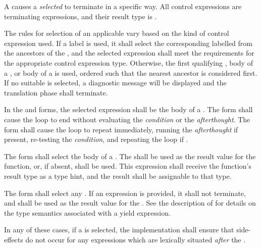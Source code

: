 \specsubsubitem
A  causes a \textit{selected}
 to terminate in a specific way. All control expressions
are terminating expressions, and their result type is .

\specsubsubitem
The rules for selection of an applicable  vary based on
the kind of control expression used. If a label is used, it shall select the
corresponding labelled  from the ancestors of
the , and the selected expression shall meet the
requirements for the appropriate control expression type. Otherwise, the first
qualifying , body of a ,
or body of a  is used, ordered such that the
nearest ancestor is considered first. If no suitable  is
selected, a diagnostic message will be displayed and the translation phase shall
terminate.

\specsubsubitem
In the  and  forms, the selected expression
shall be the body of a . The  form shall
cause the loop to end without evaluating the \textit{condition} or the
\textit{afterthought}. The  form shall cause the loop to
repeat immediately, running the \textit{afterthought} if present, re-testing the
\textit{condition}, and repeating the loop if .

\specsubsubitem
The  form shall select the body of a
. The  shall be used
as the result value for the function, or, if absent,  shall be
used. This expression shall receive the function's result type as a type hint,
and the result shall be assignable to that type.

\specsubsubitem
The  form shall select any
. If an expression is provided, it shall not
terminate, and shall be used as the result value for the
. See the description of
 for details on the type semantics associated
with a yield expression.

\specsubsubitem
In any of these cases, if a  is selected, the
implementation shall ensure that side-effects do not occur for any expressions
which are lexically situated \textit{after} the
.

